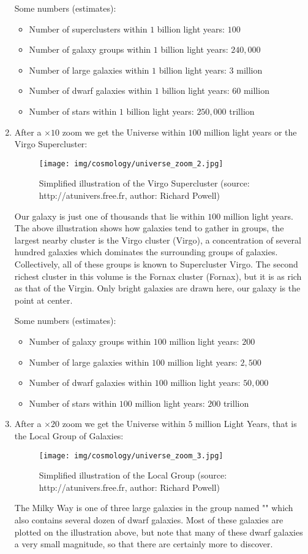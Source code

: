 \begin{enumerate}
		Some numbers (estimates):
		\begin{itemize}
			\item Number of superclusters within $1$ billion light years: $100$
			\item Number of galaxy groups within $1$ billion light years: $240,000$
			\item Number of large galaxies within $1$ billion light years: $3$ million
			\item Number of dwarf galaxies within $1$ billion light years: $60$ million
			\item Number of stars within $1$ billion light years: $250,000$ trillion
		\end{itemize}
		
		\item After a $\times 10$ zoom we get the Universe within $100$ million light years or the Virgo Supercluster:
		\begin{figure}[H]
			\centering
			\texttt{[image: img/cosmology/universe\_zoom\_2.jpg]}
			\caption{Simplified illustration of the Virgo Supercluster (source: http://atunivers.free.fr, author: Richard Powell)}
		\end{figure}
		Our galaxy is just one of thousands that lie within $100$ million light years. The above illustration shows how galaxies tend to gather in groups, the largest nearby cluster is the Virgo cluster (Virgo), a concentration of several hundred galaxies which dominates the surrounding groups of galaxies. Collectively, all of these groups is known to Supercluster Virgo. The second richest cluster in this volume is the Fornax cluster (Fornax), but it is as rich as that of the Virgin. Only bright galaxies are drawn here, our galaxy is the point at center.	
		
		Some numbers (estimates):
		\begin{itemize}
			\item Number of galaxy groups within $100$ million light years: $200$
			\item Number of large galaxies within $100$ million light years: $2,500$
			\item Number of dwarf galaxies within $100$ million light years: $50,000$
			\item Number of stars within $100$ million light years: $200$ trillion
		\end{itemize}
		
		\item After a $\times 20$ zoom we get the Universe within $5$ million Light Years, that is the Local Group of Galaxies:
		\begin{figure}[H]
			\centering
			\texttt{[image: img/cosmology/universe\_zoom\_3.jpg]}
			\caption{Simplified illustration of the Local Group (source: http://atunivers.free.fr, author: Richard Powell)}
		\end{figure}
		The Milky Way is one of three large galaxies in the group named "" which also contains several dozen of dwarf galaxies. Most of these galaxies are plotted on the illustration above, but note that many of these dwarf galaxies a very small magnitude, so that there are certainly more to discover.	
		

\end{enumerate}
